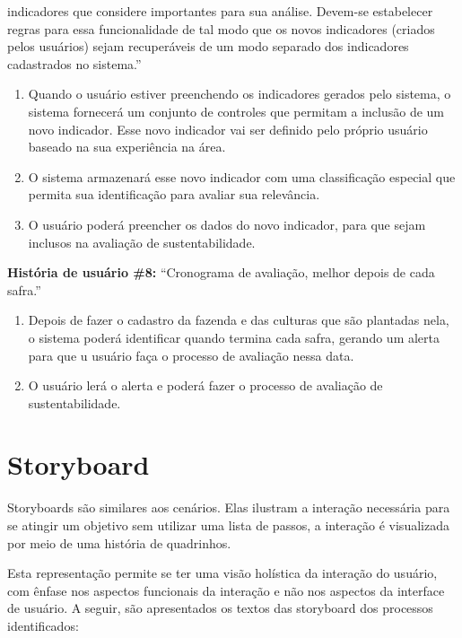 indicadores que considere importantes para sua análise. Devem-se estabelecer
regras para essa funcionalidade de tal modo que os novos indicadores
(criados pelos usuários) sejam recuperáveis de um modo separado dos
indicadores cadastrados no sistema.''
\begin{enumerate}
\item Quando o usuário estiver preenchendo os indicadores gerados pelo sistema,
o sistema fornecerá um conjunto de controles que permitam a inclusão
de um novo indicador. Esse novo indicador vai ser definido pelo próprio
usuário baseado na sua experiência na área. 
\item O sistema armazenará esse novo indicador com uma classificação especial
que permita sua identificação para avaliar sua relevância. 
\item O usuário poderá preencher os dados do novo indicador, para que sejam
inclusos na avaliação de sustentabilidade.
\end{enumerate}
\textbf{História de usuário \#8:} ``Cronograma de avaliação, melhor
depois de cada safra.''
\begin{enumerate}
\item Depois de fazer o cadastro da fazenda e das culturas que são plantadas
nela, o sistema poderá identificar quando termina cada safra, gerando
um alerta para que u usuário faça o processo de avaliação nessa data.
\item O usuário lerá o alerta e poderá fazer o processo de avaliação de
sustentabilidade. 
\end{enumerate}

\section{Storyboard}

Storyboards são similares aos cenários. Elas ilustram a interação
necessária para se atingir um objetivo sem utilizar uma lista de passos,
a interação é visualizada por meio de uma história de quadrinhos.

Esta representação permite se ter uma visão holística da interação
do usuário, com ênfase nos aspectos funcionais da interação e não
nos aspectos da interface de usuário. A seguir, são apresentados os
textos das storyboard dos processos identificados:

